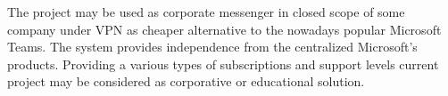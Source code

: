 The project may be used as corporate messenger in closed scope of some company under VPN as cheaper alternative to the
nowadays popular Microsoft Teams.
The system provides independence from the centralized Microsoft's products.
Providing a various types of subscriptions and support levels current project may be considered as corporative or
educational solution.
